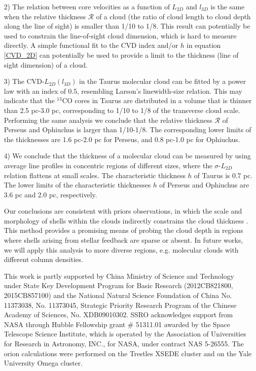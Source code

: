 \documentclass[iop,revtex4]{emulateapj}
\begin{document}
2) The relation between core velocities as a function of $L_{2D}$ and $l_{3D}$ is the same when the relative thickness $\mathcal{R}$ of a cloud (the ratio of cloud length to cloud depth along the line of sight) is smaller than 1/10 to 1/8. This result can potentially be used to constrain the line-of-sight cloud dimension, which is hard to measure directly. A simple functional fit to the CVD index and/or $h$ in equation \ref{CVD_2D} can potentially be used to provide a limit to the thickness (line of sight dimension) of a cloud.


3) The CVD-$L_{2D}(l_{3D})$ in the Taurus molecular cloud can be fitted by a power law with an index of 0.5, resembling Larson's linewidth-size relation. This may indicate that the $^{13}$CO cores in Taurus are distributed in a volume that is thinner than 2.5 pc-3.0 pc, corresponding to 1/10 to 1/8 of the transverse cloud scale. Performing the same analysis we conclude that the relative thickness $\mathcal{R}$ of Perseus and Ophiuchus is larger than 1/10-1/8.
The corresponding lower limits of the thicknesses are 1.6 pc-2.0 pc for Perseus, and 0.8 pc-1.0 pc for Ophiuchus.


4) We conclude that the thickness of a molecular cloud can be measured by using average line profiles in concentric regions of different sizes, where the $\sigma$-$L_{2D}$ relation flattens at small scales. The characteristic thickness $h$ of Taurus is 0.7 pc. The lower limits of the characteristic thicknesses $h$ of Perseus and Ophiuchus are 3.6 pc and 2.0 pc, respectively.


Our conclusions are consistent with priors observations, in which the scale and morphology of shells within the clouds indirectly constrains the cloud thickness \citep{Arce2011,Li2015}. This method provides a promising means of probing the cloud depth in regions where shells arising from stellar feedback are sparse or absent. In future works, we will apply this analysis to more diverse regions, e.g. molecular clouds with different column densities.

\acknowledgments This work is partly supported by  China Ministry of
Science and Technology under State Key Development Program for Basic
Research (2012CB821800, 2015CB857100) and the National Natural Science Foundation of China No. 11373038, No. 11373045, Strategic Priority Research Program of the Chinese Academy of Sciences, No. XDB09010302. SSRO acknowledges support from NASA through Hubble Fellowship grant \# 51311.01 awarded by the Space Telescope Science Institute, which is operated by the Association of Universities for Research in Astronomy, INC., for
NASA, under contract NAS 5-26555. The {\sc orion} calculations were performed on the Trestles XSEDE cluster and on the Yale University Omega cluster.
\end{document}
